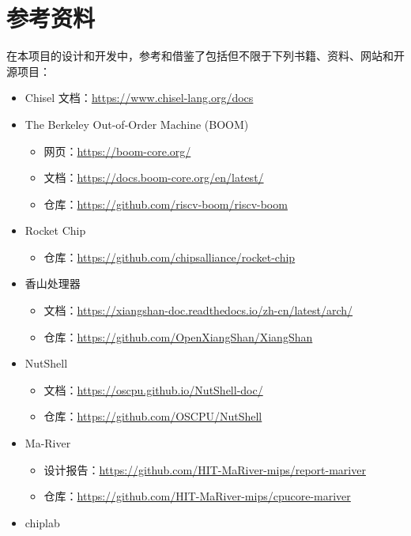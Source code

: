 \documentclass{article}
\begin{document}
\section{参考资料}
在本项目的设计和开发中，参考和借鉴了包括但不限于下列书籍、资料、网站和开源项目：
\begin{itemize}
    \item Chisel 文档：\url{https://www.chisel-lang.org/docs}
    \item The Berkeley Out-of-Order Machine (BOOM)
          \begin{itemize}
              \item 网页：\url{https://boom-core.org/}
              \item 文档：\url{https://docs.boom-core.org/en/latest/}
              \item 仓库：\url{https://github.com/riscv-boom/riscv-boom}
          \end{itemize}
    \item Rocket Chip
          \begin{itemize}
              \item 仓库：\url{https://github.com/chipsalliance/rocket-chip}
          \end{itemize}
    \item 香山处理器
          \begin{itemize}
              \item 文档：\url{https://xiangshan-doc.readthedocs.io/zh-cn/latest/arch/}
              \item 仓库：\url{https://github.com/OpenXiangShan/XiangShan}
          \end{itemize}
    \item NutShell
          \begin{itemize}
              \item 文档：\url{https://oscpu.github.io/NutShell-doc/}
              \item 仓库：\url{https://github.com/OSCPU/NutShell}
          \end{itemize}
    \item Ma-River
          \begin{itemize}
              \item 设计报告：\url{https://github.com/HIT-MaRiver-mips/report-mariver}
              \item 仓库：\url{https://github.com/HIT-MaRiver-mips/cpucore-mariver}
          \end{itemize}
    \item chiplab

\end{itemize}
\end{document}
